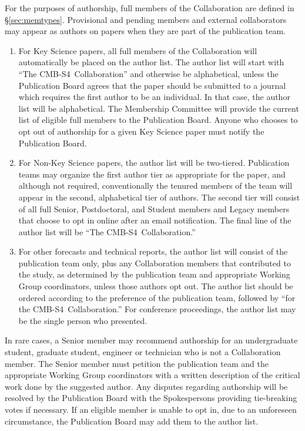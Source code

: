 \documentclass[12pt]{article}
\newcommand\collabname{CMB-S4}
\begin{document}
For the purposes of authorship, full members of the Collaboration are defined in \S\ref{sec:memtypes}.  Provisional and pending members and external collaborators may appear as authors on papers when they are part of the publication team.

\begin{enumerate}

\item For Key Science papers, all full members of the Collaboration will automatically be placed on the author list. The author list will start with ``The \collabname\ Collaboration'' and otherwise be alphabetical, unless the Publication Board agrees that the paper should be submitted to a journal which requires the first author to be an individual. In that case, the author list will be alphabetical. The Membership Committee will provide the current list of eligible  full members to the Publication Board. Anyone who chooses to opt out of authorship for a given Key Science paper must notify the Publication Board.

\item For Non-Key Science papers, the author list will be two-tiered. Publication teams may organize the first author tier as appropriate for the paper, and although not required, conventionally the tenured members of the team will appear in the second, alphabetical tier of authors. The second tier will consist of all  full Senior, Postdoctoral, and Student members and Legacy members that choose to opt in online after an email notification.  The final line of the author list will be ``The \collabname\ Collaboration.''

\item For other forecasts and technical reports, the author list will consist of the publication team only, plus any Collaboration members that contributed to the study, as determined by the publication team and appropriate Working Group coordinators, unless those authors opt out. The author list should be ordered according to the preference of the publication team, followed by ``for the \collabname\ Collaboration.''  For conference proceedings, the author list may be the single person who presented.

\end{enumerate}

In rare cases, a Senior member may recommend authorship for an undergraduate student, graduate student, engineer or technician who is not a Collaboration member.  The Senior member must petition the publication team and the appropriate Working Group coordinators with a written description of the critical work done by the suggested author.
Any disputes regarding authorship will be resolved by the Publication Board with the Spokespersons providing  tie-breaking votes if necessary.  If an eligible member is unable to opt in, due to an unforeseen circumstance, the Publication Board may add them to the author list.
\end{document}
